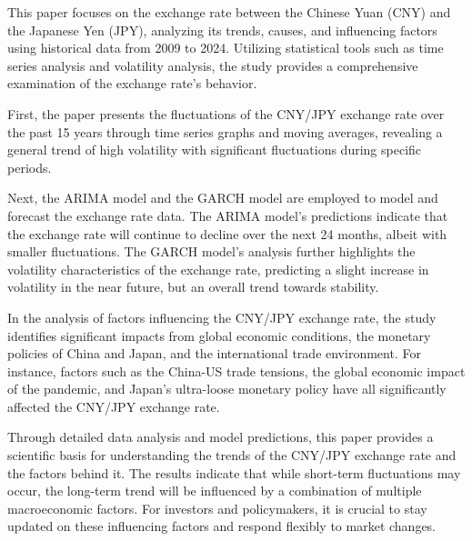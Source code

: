 \begin{abstract*}
  This paper focuses on the exchange rate between the Chinese Yuan (CNY) and the Japanese Yen (JPY), analyzing its trends, causes, and influencing factors using historical data from 2009 to 2024. Utilizing statistical tools such as time series analysis and volatility analysis, the study provides a comprehensive examination of the exchange rate's behavior. 

  First, the paper presents the fluctuations of the CNY/JPY exchange rate over the past 15 years through time series graphs and moving averages, revealing a general trend of high volatility with significant fluctuations during specific periods. 
  
  Next, the ARIMA model and the GARCH model are employed to model and forecast the exchange rate data. The ARIMA model's predictions indicate that the exchange rate will continue to decline over the next 24 months, albeit with smaller fluctuations. The GARCH model's analysis further highlights the volatility characteristics of the exchange rate, predicting a slight increase in volatility in the near future, but an overall trend towards stability.
  
  In the analysis of factors influencing the CNY/JPY exchange rate, the study identifies significant impacts from global economic conditions, the monetary policies of China and Japan, and the international trade environment. For instance, factors such as the China-US trade tensions, the global economic impact of the pandemic, and Japan's ultra-loose monetary policy have all significantly affected the CNY/JPY exchange rate.
  
  Through detailed data analysis and model predictions, this paper provides a scientific basis for understanding the trends of the CNY/JPY exchange rate and the factors behind it. The results indicate that while short-term fluctuations may occur, the long-term trend will be influenced by a combination of multiple macroeconomic factors. For investors and policymakers, it is crucial to stay updated on these influencing factors and respond flexibly to market changes.
  
\end{abstract*}
